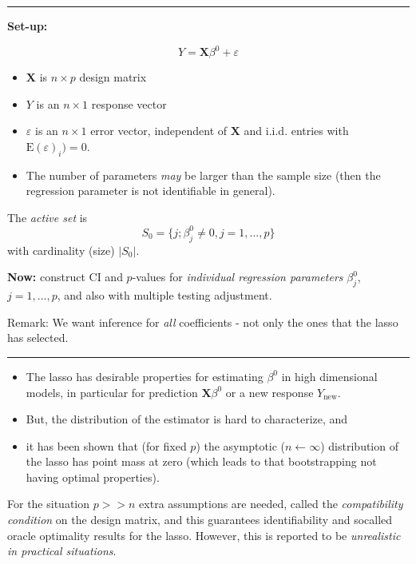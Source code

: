 \documentclass[
  letterpaper,
  DIV=11,
  numbers=noendperiod]{scrartcl}
\providecommand{\tightlist}{%
  \setlength{\itemsep}{0pt}\setlength{\parskip}{0pt}}\usepackage{longtable,booktabs,array}
\begin{document}
\begin{center}\rule{0.5\linewidth}{0.5pt}\end{center}

\textbf{Set-up:}

\[Y={\boldsymbol X} \beta^0 +\varepsilon\]

\begin{itemize}
\tightlist
\item
  \({\boldsymbol X}\) is \(n\times p\) design matrix
\item
  \(Y\) is an \(n \times 1\) response vector
\item
  \(\varepsilon\) is an \(n \times 1\) error vector, independent of
  \({\boldsymbol X}\) and i.i.d. entries with
  \(\text{E}(\varepsilon)_i)=0\).
\item
  The number of parameters \emph{may} be larger than the sample size
  (then the regression parameter is not identifiable in general).
\end{itemize}

The \emph{active set} is \[S_0=\{ j; \beta_j^0 \neq 0,j=1,\ldots,p\}\]
with cardinality (size) \(\lvert S_0 \rvert\).

\textbf{Now:} construct CI and \(p\)-values for \emph{individual
regression parameters} \(\beta_j^0\), \(j=1,\ldots, p\), and also with
multiple testing adjustment.

Remark: We want inference for \emph{all} coefficients - not only the
ones that the lasso has selected.

\begin{center}\rule{0.5\linewidth}{0.5pt}\end{center}

\begin{itemize}
\tightlist
\item
  The lasso has desirable properties for estimating \(\beta^0\) in high
  dimensional models, in particular for prediction
  \({\boldsymbol X}\beta^0\) or a new response \(Y_{\text{new}}\).
\item
  But, the distribution of the estimator is hard to characterize, and
\item
  it has been shown that (for fixed \(p\)) the asymptotic
  (\(n\leftarrow \infty\)) distribution of the lasso has point mass at
  zero (which leads to that bootstrapping not having optimal
  properties).
\end{itemize}

For the situation \(p >> n\) extra assumptions are needed, called the
\emph{compatibility condition} on the design matrix, and this guarantees
identifiability and socalled oracle optimality results for the lasso.
However, this is reported to be \emph{unrealistic in practical
situations}.
\end{document}
